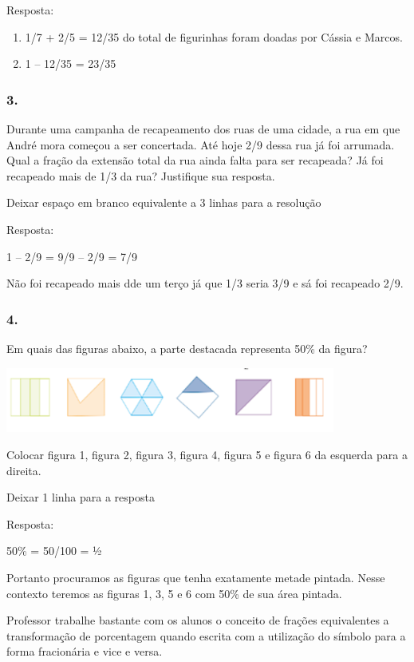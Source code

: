 Resposta:

\begin{enumerate}
\def\labelenumi{\alph{enumi})}
\item
  1/7 + 2/5 = 12/35 do total de figurinhas foram doadas por Cássia e
  Marcos.
\item
  1 -- 12/35 = 23/35
\end{enumerate}

\subsubsection{3.}\label{section-106}

Durante uma campanha de recapeamento dos ruas de uma cidade, a rua em
que André mora começou a ser concertada. Até hoje 2/9 dessa rua já foi
arrumada. Qual a fração da extensão total da rua ainda falta para ser
recapeada? Já foi recapeado mais de 1/3 da rua? Justifique sua resposta.

Deixar espaço em branco equivalente a 3 linhas para a resolução

Resposta:

1 -- 2/9 = 9/9 -- 2/9 = 7/9

Não foi recapeado mais dde um terço já que 1/3 seria 3/9 e sá foi
recapeado 2/9.

\subsubsection{4. }\label{section-107}

Em quais das figuras abaixo, a parte destacada representa 50\% da
figura?

\includegraphics[width=4.27537in,height=0.84174in]{media/image107.png}

Colocar figura 1, figura 2, figura 3, figura 4, figura 5 e figura 6 da
esquerda para a direita.

Deixar 1 linha para a resposta

Resposta:

50\% = 50/100 = ½

Portanto procuramos as figuras que tenha exatamente metade pintada.
Nesse contexto teremos as figuras 1, 3, 5 e 6 com 50\% de sua área
pintada.

Professor trabalhe bastante com os alunos o conceito de frações
equivalentes a transformação de porcentagem quando escrita com a
utilização do símbolo para a forma fracionária e vice e versa.

